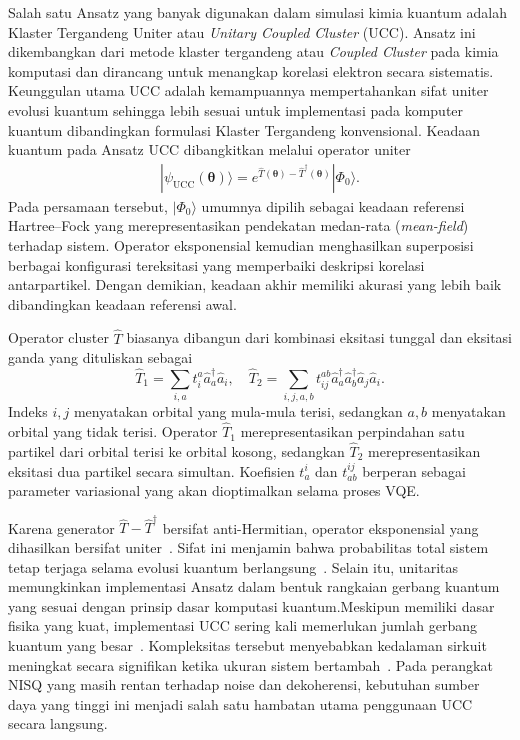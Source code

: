 Salah satu Ansatz yang banyak digunakan dalam simulasi kimia kuantum adalah Klaster Tergandeng Uniter atau \textit{Unitary Coupled Cluster} (UCC). Ansatz ini dikembangkan dari metode klaster tergandeng atau \textit{Coupled Cluster} pada kimia komputasi dan dirancang untuk menangkap korelasi elektron secara sistematis. Keunggulan utama UCC adalah kemampuannya mempertahankan sifat uniter evolusi kuantum sehingga lebih sesuai untuk implementasi pada komputer kuantum dibandingkan formulasi Klaster Tergandeng konvensional. Keadaan kuantum pada Ansatz UCC dibangkitkan melalui operator uniter
\begin{equation}
    \label{eq:ucc_ansatz}
    \begin{split}
    |\psi_{\text{UCC}}(\boldsymbol{\theta})\rangle = e^{\hat{T}(\boldsymbol{\theta})-\hat{T}^{\dagger}(\boldsymbol{\theta})}|\Phi_0\rangle.
    \end{split}
\end{equation}
Pada persamaan tersebut, $|\Phi_0\rangle$ umumnya dipilih sebagai keadaan referensi Hartree--Fock yang merepresentasikan pendekatan medan-rata (\textit{mean-field}) terhadap sistem. Operator eksponensial kemudian menghasilkan superposisi berbagai konfigurasi tereksitasi yang memperbaiki deskripsi korelasi antarpartikel. Dengan demikian, keadaan akhir memiliki akurasi yang lebih baik dibandingkan keadaan referensi awal.

Operator cluster $\hat{T}$ biasanya dibangun dari kombinasi eksitasi tunggal dan eksitasi ganda yang dituliskan sebagai
\begin{equation}
    \label{eq:ucc_ansatz_2}
    \hat{T}_1 = \sum_{i,a} t_i^a \hat{a}^\dagger_a \hat{a}_i, \quad \hat{T}_2 = \sum_{i,j,a,b} t_{ij}^{ab} \hat{a}^\dagger_a \hat{a}^\dagger_b \hat{a}_j \hat{a}_i.
\end{equation}
Indeks $i, j$ menyatakan orbital yang mula-mula terisi, sedangkan $a, b$ menyatakan orbital yang tidak terisi. Operator $\hat{T}_1$ merepresentasikan perpindahan satu partikel dari orbital terisi ke orbital kosong, sedangkan $\hat{T}_2$ merepresentasikan eksitasi dua partikel secara simultan. Koefisien $t_a^i$ dan $t_{ab}^{ij}$ berperan sebagai parameter variasional yang akan dioptimalkan selama proses VQE.

Karena generator $\hat{T} - \hat{T}^\dagger$ bersifat anti-Hermitian, operator eksponensial yang dihasilkan bersifat uniter~\cite{dixit_variational_2025}. Sifat ini menjamin bahwa probabilitas total sistem tetap terjaga selama evolusi kuantum berlangsung~. Selain itu, unitaritas memungkinkan implementasi Ansatz dalam bentuk rangkaian gerbang kuantum yang sesuai dengan prinsip dasar komputasi kuantum.Meskipun memiliki dasar fisika yang kuat, implementasi UCC sering kali memerlukan jumlah gerbang kuantum yang besar~. Kompleksitas tersebut menyebabkan kedalaman sirkuit meningkat secara signifikan ketika ukuran sistem bertambah~. Pada perangkat NISQ yang masih rentan terhadap noise dan dekoherensi, kebutuhan sumber daya yang tinggi ini menjadi salah satu hambatan utama penggunaan UCC secara
langsung.


